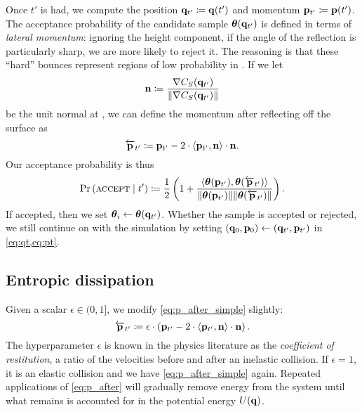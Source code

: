 Once $t'$ is had, we compute the position $\mathbf{q}_{t'} \coloneqq \mathbf{q}(t')$ and
momentum $\mathbf{p}_{t'} \coloneqq \mathbf{p}(t')$. The acceptance probability of the
candidate sample $\boldsymbol{\theta}(\mathbf{q}_{t'})$ is defined in terms of \emph{lateral
momentum}: ignoring the height component, if the angle of the reflection is
particularly sharp, we are more likely to reject it. The reasoning is that these
``hard'' bounces represent regions of low probability in \target{}. If we let
\begin{equation*}
    \mathbf{n} \coloneqq \frac{\nabla C_{S}({\mathbf{q}_{t'}})}{\lVert \nabla C_{S}({\mathbf{q}_{t'}}) \rVert}
\end{equation*}
be the unit normal at , we can define the momentum after reflecting off
the surface as
\begin{equation}
    \label{eq:p_after_simple}
    \overleftarrow{\mathbf{p}}_{t'} \coloneqq \mathbf{p}_{t'} - 2 \cdot \left<\mathbf{p}_{t'}, \mathbf{n}\right> \cdot \mathbf{n}.
\end{equation}
Our acceptance probability is thus
\begin{equation}
    \label{eq:accept}
    \Pr\left(\textsc{accept} \mid t'\right)
    \coloneqq \frac{1}{2}
    \left(1 + \frac{
        \left<\boldsymbol{\theta}(\mathbf{p}_{t'}),\boldsymbol{\theta}(\overleftarrow{\mathbf{p}}_{t'})\right>
    }{
        \lVert \boldsymbol{\theta}(\mathbf{p}_{t'}) \rVert \lVert \boldsymbol{\theta}(\overleftarrow{\mathbf{p}}_{t'}) \rVert
    }\right).
\end{equation}
If accepted, then we set $\boldsymbol{\theta}_i \gets \boldsymbol{\theta}(\mathbf{q}_{t'})$. Whether the
sample is accepted or rejected, we still continue on with the simulation
by setting $(\mathbf{q}_{0}{}, \mathbf{p}_{0}{}) \gets (\mathbf{q}_{t'}, \mathbf{p}_{t'})$ in \cref{eq:qt,eq:pt}.

\subsection{Entropic dissipation} \label{ss:entropy}

Given a scalar $\epsilon \in (0,1]$, we modify \cref{eq:p_after_simple} slightly:
\begin{equation}
    \label{eq:p_after}
    \overleftarrow{\mathbf{p}}_{t'} \coloneqq \epsilon \cdot \left(\mathbf{p}_{t'} - 2 \cdot \left<\mathbf{p}_{t'}, \mathbf{n}\right> \cdot \mathbf{n}\right).
\end{equation}
The hyperparameter $\epsilon$ is known in the physics literature as the
\emph{coefficient of restitution}, a ratio of the velocities before and after an
inelastic collision. If $\epsilon = 1$, it is an elastic collision and we have
\cref{eq:p_after_simple} again. Repeated applications of \cref{eq:p_after} will
gradually remove energy from the system until what remains is accounted for in
the potential energy $U(\mathbf{q}{})$.

